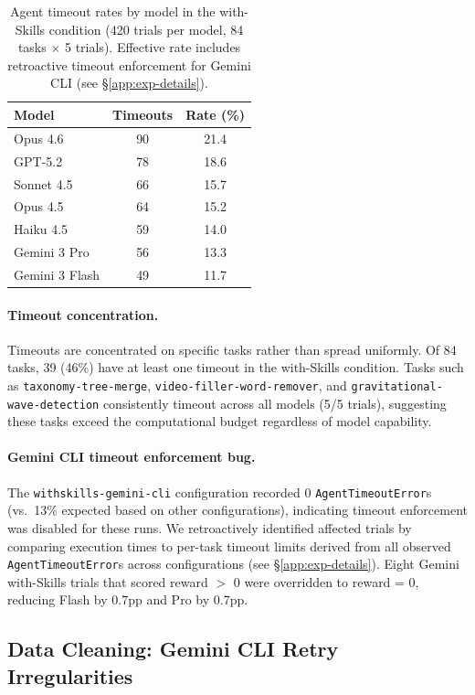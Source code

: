 \begin{table}[htb]
\centering
\small
\caption{Agent timeout rates by model in the with-Skills condition (420 trials per model, 84 tasks $\times$ 5 trials). Effective rate includes retroactive timeout enforcement for Gemini CLI (see \S\ref{app:exp-details}).}
\label{tab:timeout-rates}
\begin{tabular}{lcc}
\toprule
\textbf{Model} & \textbf{Timeouts} & \textbf{Rate (\%)} \\
\midrule
Opus 4.6 & 90 & 21.4 \\
GPT-5.2 & 78 & 18.6 \\
Sonnet 4.5 & 66 & 15.7 \\
Opus 4.5 & 64 & 15.2 \\
Haiku 4.5 & 59 & 14.0 \\
Gemini 3 Pro & 56 & 13.3 \\
Gemini 3 Flash & 49 & 11.7 \\
\bottomrule
\end{tabular}
\end{table}

\paragraph{Timeout concentration.}
Timeouts are concentrated on specific tasks rather than spread uniformly. Of 84 tasks, 39 (46\%) have at least one timeout in the with-Skills condition. Tasks such as \texttt{taxonomy-tree-merge}, \texttt{video-filler-word-remover}, and \texttt{gravitational-wave-detection} consistently timeout across all models (5/5 trials), suggesting these tasks exceed the computational budget regardless of model capability.

\paragraph{Gemini CLI timeout enforcement bug.}
The \texttt{withskills-gemini-cli} configuration recorded 0 \texttt{AgentTimeoutError}s (vs.\ 13\% expected based on other configurations), indicating timeout enforcement was disabled for these runs. We retroactively identified affected trials by comparing execution times to per-task timeout limits derived from all observed \texttt{AgentTimeoutError}s across configurations (see \S\ref{app:exp-details}). Eight Gemini with-Skills trials that scored reward $>$ 0 were overridden to reward = 0, reducing Flash by 0.7pp and Pro by 0.7pp.

\subsection{Data Cleaning: Gemini CLI Retry Irregularities}

